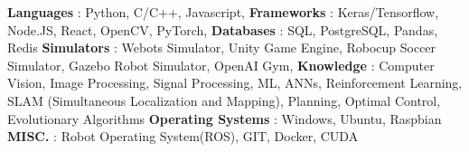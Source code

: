 \begin{cventries}  
\skillentry
    {
    \space \textbf{Languages} : Python, C/C++, Javascript, 
    \space \textbf{Frameworks} : Keras/Tensorflow, Node.JS, React, OpenCV, PyTorch, 
    \space \textbf{Databases} : SQL, PostgreSQL, Pandas, Redis 
    \space \textbf{Simulators} : Webots Simulator, Unity Game Engine, Robocup Soccer Simulator, Gazebo Robot Simulator, OpenAI Gym,
    \space \textbf{Knowledge} : Computer Vision, Image Processing, Signal Processing, ML, ANNs, Reinforcement Learning, SLAM (Simultaneous Localization and Mapping), Planning, Optimal Control, Evolutionary Algorithms
    \space \textbf{Operating Systems} : Windows, Ubuntu, Raspbian 
    \space \textbf{MISC.} : Robot Operating System(ROS), GIT, Docker, CUDA
    }
    

\end{cventries}
\vspace{0.5 cm}